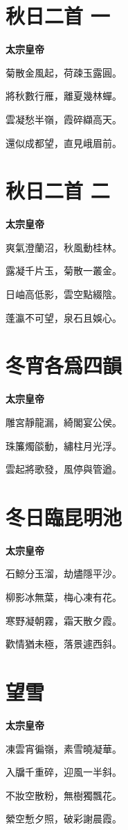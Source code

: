 \documentclass[12pt,a4paper]{ctexbook}
\begin{document}
\section{秋日二首 一}
\textbf{太宗皇帝}\par\vspace{0.5em}
菊散金風起，荷疎玉露圓。\par
將秋數行雁，離夏幾林蟬。\par
雲凝愁半嶺，霞碎纈高天。\par
還似成都望，直見峨眉前。\par

\section{秋日二首 二}
\textbf{太宗皇帝}\par\vspace{0.5em}
爽氣澄蘭沼，秋風動桂林。\par
露凝千片玉，菊散一叢金。\par
日岫高低影，雲空點綴陰。\par
蓬瀛不可望，泉石且娛心。\par

\section{冬宵各爲四韻}
\textbf{太宗皇帝}\par\vspace{0.5em}
雕宮靜龍漏，綺閣宴公侯。\par
珠簾燭燄動，繡柱月光浮。\par
雲起將歌發，風停與管遒。\par

\section{冬日臨昆明池}
\textbf{太宗皇帝}\par\vspace{0.5em}
石鯨分玉溜，劫燼隱平沙。\par
柳影冰無葉，梅心凍有花。\par
寒野凝朝霧，霜天散夕霞。\par
歡情猶未極，落景遽西斜。\par

\section{望雪}
\textbf{太宗皇帝}\par\vspace{0.5em}
凍雲宵徧嶺，素雪曉凝華。\par
入牖千重碎，迎風一半斜。\par
不妝空散粉，無樹獨飄花。\par
縈空慙夕照，破彩謝晨霞。\par
\end{document}
